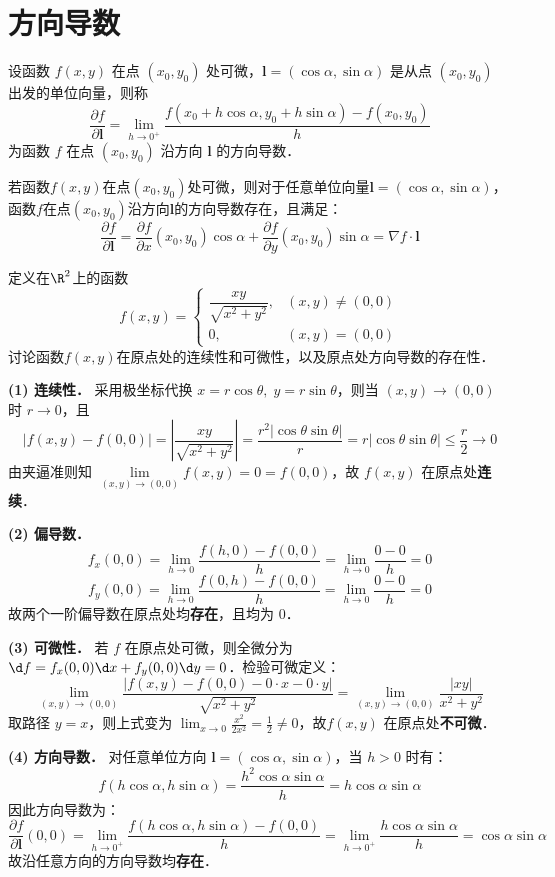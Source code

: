 \documentclass[12pt, a4paper, oneside, UTF8]{ctexbook}
\begin{document}
\section{方向导数}
\begin{definition}
    设函数 $f(x, y)$ 在点 $(x_0, y_0)$ 处可微，$\bm{l} = (\cos \alpha, \sin \alpha)$ 是从点 $(x_0, y_0)$ 出发的单位向量，则称
    \[ \frac{\partial f}{\partial \bm{l}} = \lim_{h \to 0^+} \frac{f(x_0 + h\cos \alpha, y_0 + h\sin \alpha) - f(x_0, y_0)}{h} \]
    为函数 $f$ 在点 $(x_0, y_0)$ 沿方向 $\bm{l}$ 的方向导数．
\end{definition}
\begin{theorem}
    若函数$f(x,y)$在点$(x_0,y_0)$处可微，则对于任意单位向量$\bm{l}=(\cos \alpha, \sin \alpha)$，函数$f$在点$(x_0,y_0)$沿方向$\bm{l}$的方向导数存在，且满足：
    \[ \frac{\partial f}{\partial \bm{l}} = \frac{\partial f}{\partial x}(x_0, y_0) \cos \alpha + \frac{\partial f}{\partial y}(x_0, y_0) \sin \alpha = \nabla f \cdot \bm{l} \]
\end{theorem}

\begin{example}
    定义在$\R^2$上的函数
    \[f(x,y) = \begin{cases}
        \dfrac{xy}{\sqrt{x^2+y^2}}, & (x,y)\neq(0,0)\\[1em]
        0, & (x,y)=(0,0)
    \end{cases}\]
    讨论函数$f(x,y)$在原点处的连续性和可微性，以及原点处方向导数的存在性．
\end{example}
\begin{solution}
    \textbf{(1) 连续性．}
    采用极坐标代换 $x = r\cos\theta,\; y = r\sin\theta$，则当 $(x,y) \to (0,0)$ 时 $r \to 0$，且
    \[ |f(x,y)-f(0,0)| = \left|\frac{xy}{\sqrt{x^2+y^2}}\right| = \frac{r^2|\cos\theta\sin\theta|}{r} = r|\cos\theta\sin\theta| \le \frac{r}{2} \to 0 \]
    由夹逼准则知 $\lim\limits_{(x,y)\to(0,0)} f(x,y) = 0 = f(0,0)$，故 $f(x,y)$ 在原点处\textbf{连续}．

    \textbf{(2) 偏导数．}
    \[ f_x(0,0) = \lim_{h\to 0} \frac{f(h,0)-f(0,0)}{h} = \lim_{h\to 0} \frac{0-0}{h} = 0 \]
    \[ f_y(0,0) = \lim_{h\to 0} \frac{f(0,h)-f(0,0)}{h} = \lim_{h\to 0} \frac{0-0}{h} = 0 \]
    故两个一阶偏导数在原点处均\textbf{存在}，且均为 $0$．

    \textbf{(3) 可微性．}
    若 $f$ 在原点处可微，则全微分为 $\d f = f_x(0,0)\d x + f_y(0,0)\d y = 0$．检验可微定义：
    \[ \lim_{(x,y)\to(0,0)} \frac{|f(x,y)-f(0,0)-0\cdot x-0\cdot y|}{\sqrt{x^2+y^2}} = \lim_{(x,y)\to(0,0)} \frac{|xy|}{x^2+y^2} \]
    取路径 $y = x$，则上式变为 $\displaystyle\lim_{x\to 0} \frac{x^2}{2x^2} = \frac12 \neq 0$，故$f(x,y)$ 在原点处\textbf{不可微}．

    \textbf{(4) 方向导数．}
    对任意单位方向 $\bm{l} = (\cos\alpha,\sin\alpha)$，当 $h>0$ 时有：
    \[ f(h\cos\alpha, h\sin\alpha) = \frac{h^2\cos\alpha\sin\alpha}{h} = h\cos\alpha\sin\alpha \]
    因此方向导数为：
    \[ \frac{\partial f}{\partial \bm{l}}(0,0) = \lim_{h\to 0^+} \frac{f(h\cos\alpha, h\sin\alpha)-f(0,0)}{h} = \lim_{h\to 0^+} \frac{h\cos\alpha\sin\alpha}{h} = \cos\alpha\sin\alpha \]
    故沿任意方向的方向导数均\textbf{存在}．
\end{solution}
\end{document}
